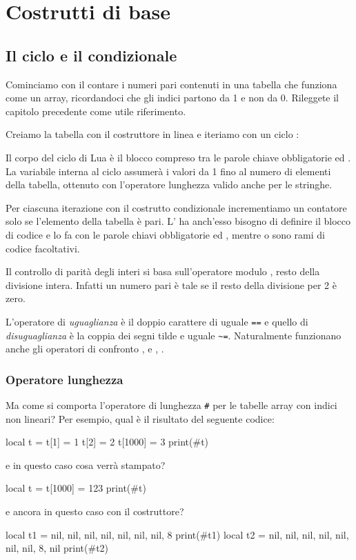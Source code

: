

\chapter{Costrutti di base}

\section{Il ciclo  e il condizionale }
\label{secFondCicloIf}

Cominciamo con il contare i numeri pari contenuti in una tabella che funziona
come un array, ricordandoci che gli indici partono da 1 e non da 0. Rileggete
il capitolo precedente come utile riferimento.

Creiamo la tabella con il costruttore in linea e iteriamo con un ciclo
:

Il corpo del ciclo  di Lua è il blocco compreso tra le parole chiave
obbligatorie  ed . La variabile  interna al ciclo
assumerà i valori da 1 fino al numero di elementi della tabella, ottenuto con
l'operatore lunghezza \key{\#} valido anche per le stringhe.

Per ciascuna iterazione con il costrutto condizionale  incrementiamo un
contatore solo se l'elemento della tabella è pari. L' ha anch'esso
bisogno di definire il blocco di codice e lo fa con le parole chiavi
obbligatorie  ed , mentre  o  sono rami
di codice facoltativi.

Il controllo di parità degli interi si basa sull'operatore modulo \key{\%},
resto della divisione intera. Infatti un numero pari è tale se il resto della
divisione per 2 è zero. 

L'operatore di \emph{uguaglianza} è il doppio carattere di uguale \texttt{==} e
quello di \emph{disuguaglianza} è la coppia dei segni tilde e uguale
\verb|~=|. Naturalmente funzionano anche gli operatori di confronto \key{>},
\key{>=} e \key{<}, \key{<=}.


\subsection{Operatore lunghezza}

Ma come si comporta l'operatore di lunghezza \texttt{\#} per le tabelle array
con indici non lineari? Per esempio, qual è il risultato del seguente codice:
\begin{lines}
local t = {}
t[1] = 1
t[2] = 2
t[1000] = 3
print(#t)
\end{lines}
e in questo caso cosa verrà stampato?
\begin{lines}
local t = {}
t[1000] = 123
print(#t)
\end{lines}
e ancora in questo caso con il costruttore?
\begin{lines}
local t1 = {nil, nil,  nil, nil, nil, nil, nil, 8}
print(#t1)
local t2 = {nil, nil,  nil, nil, nil, nil, nil, 8, nil}
print(#t2)
\end{lines}

